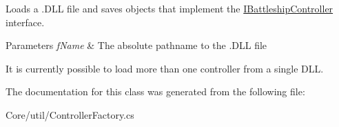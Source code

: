 Loads a .D\-L\-L file and saves objects that implement the \hyperlink{interface_m_b_c_1_1_core_1_1_i_battleship_controller}{I\-Battleship\-Controller} interface.


\begin{DoxyParams}{Parameters}
{\em f\-Name} & The absolute pathname to the .D\-L\-L file\\
\hline
\end{DoxyParams}


It is currently possible to load more than one controller from a single D\-L\-L.

The documentation for this class was generated from the following file\-:\begin{DoxyCompactItemize}
\item 
Core/util/Controller\-Factory.\-cs\end{DoxyCompactItemize}

